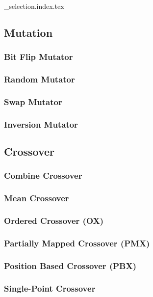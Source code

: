   {_selection.index.tex}
  \subsection{Mutation}
  \label{sec:keen:operators:mutation}
    \subsubsection{Bit Flip Mutator}
    \label{sec:keen:operators:mutation:bit_flip}
      \Blindtext
    \subsubsection{Random Mutator}
    \label{sec:keen:operators:mutation:simple}
      \Blindtext
    \subsubsection{Swap Mutator}
    \label{sec:keen:operators:mutation:swap}
      \Blindtext
    \subsubsection{Inversion Mutator}
    \label{sec:keen:operators:mutation:inversion}
      \Blindtext
  \subsection{Crossover}
  \label{sec:keen:operators:crossover}
    \subsubsection{Combine Crossover}
    \label{sec:keen:operators:crossover:combine}
      \Blindtext
    \subsubsection{Mean Crossover}
    \label{sec:keen:operators:crossover:mean}
      \Blindtext
    \subsubsection{Ordered Crossover (OX)}
    \label{sec:keen:operators:crossover:ordered}
      \Blindtext
    \subsubsection{Partially Mapped Crossover (PMX)}
    \label{sec:keen:operators:crossover:partially_mapped}
      \Blindtext
    \subsubsection{Position Based Crossover (PBX)}
    \label{sec:keen:operators:crossover:position_based}
      \Blindtext
    \subsubsection{Single-Point Crossover}
    \label{sec:keen:operators:crossover:single_point}
      \Blindtext
